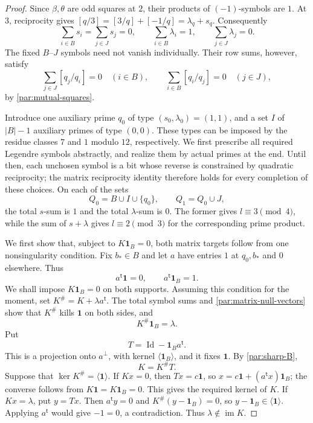 \begin{proof}
Since $\beta,\theta$ are odd squares at $2$, their products of
$(-1)$-symbols are $1$. At $3$, reciprocity gives
$[q/3]=[3/q]+[-1/q]=\lambda_q+s_q$. Consequently
\begin{equation}\label{par:fixed-symbol-sums}
 \sum_{i\in B}s_i=\sum_{j\in J}s_j=0,\qquad
 \sum_{i\in B}\lambda_i=1,\qquad
 \sum_{j\in J}\lambda_j=0.
\end{equation}
The fixed $B$--$J$ symbols need not vanish individually. Their
row sums, however, satisfy
\begin{equation}\label{par:cross-symbol-sums}
 \sum_{j\in J}[q_j/q_i]=0\quad(i\in B),\qquad
 \sum_{i\in B}[q_i/q_j]=0\quad(j\in J),
\end{equation}
by \eqref{par:mutual-squares}.

Introduce one auxiliary prime $q_0$ of type
$(s_0,\lambda_0)=(1,1)$, and a set $I$ of $|B|-1$ auxiliary
primes of type $(0,0)$. These types can be imposed by the residue
classes $7$ and $1$ modulo $12$, respectively. We first prescribe
all required Legendre symbols abstractly, and realize them by actual
primes at the end. Until then, each unchosen symbol is a bit whose reverse
is constrained by quadratic reciprocity; the matrix reciprocity identity
therefore holds for every completion of these choices. On each of the sets
\[
 Q_0=B\cup I\cup\{q_0\},\qquad Q_1=Q_0\cup J,
\]
the total $s$-sum is $1$ and the total $\lambda$-sum is $0$.
The former gives $l\equiv3\pmod4$, while the sum of $s+\lambda$
gives $l\equiv2\pmod3$ for the corresponding prime product.

We first show that, subject to $K\mathbf1_B=0$, both matrix targets follow
from one nonsingularity condition. Fix $b_*\in B$ and let $a$ have entries
$1$ at $q_0,b_*$ and $0$ elsewhere. Thus
\[
 a^{\mathsf t}\mathbf1=0,\qquad
 a^{\mathsf t}\mathbf1_B=1.
\]
We shall impose $K\mathbf1_B=0$ on both supports. Assuming this condition
for the moment, set $K^\#=K+\lambda a^{\mathsf t}$. The total symbol
sums and \eqref{par:matrix-null-vectors} show that $K^\#$ kills
$\mathbf1$ on both sides, and
\begin{equation}\label{par:sharp-B}
 K^\#\mathbf1_B=\lambda.
\end{equation}
Put
\[
 T=\operatorname{Id}-\mathbf1_Ba^{\mathsf t}.
\]
This is a projection onto $a^\perp$, with kernel
$\langle\mathbf1_B\rangle$, and it fixes $\mathbf1$. By
\eqref{par:sharp-B},
\begin{equation}\label{par:projection-factorization}
 K=K^\#T.
\end{equation}
Suppose that $\ker K^\#=\langle\mathbf1\rangle$. If $Kx=0$, then
$Tx=c\mathbf1$, so
$x=c\mathbf1+(a^{\mathsf t}x)\mathbf1_B$; the converse follows from
$K\mathbf1=K\mathbf1_B=0$. This gives the required kernel of $K$.
If $Kx=\lambda$, put $y=Tx$. Then $a^{\mathsf t}y=0$ and
$K^\#(y-\mathbf1_B)=0$, so
$y-\mathbf1_B\in\langle\mathbf1\rangle$. Applying $a^{\mathsf t}$
would give $-1=0$, a contradiction. Thus $\lambda\notin\operatorname{im}K$.


\end{proof}
